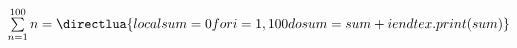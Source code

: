 \documentclass[border=20pt]{standalone}
\begin{document}
$\sum\limits_{n=1}^{100} n = \directlua{
    local sum = 0
    for i=1,100 do
        sum = sum + i
    end
    tex.print(sum)
}$
\end{document}
